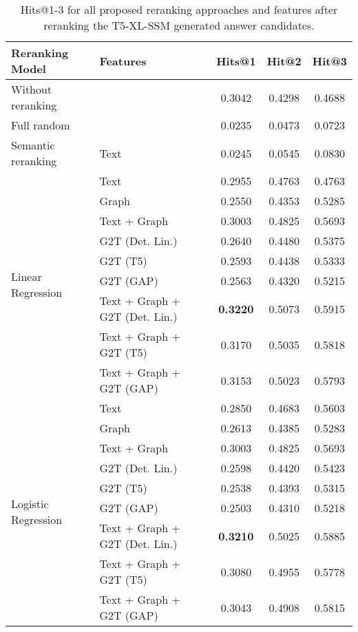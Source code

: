 \begin{table}[htbp]
    \caption{Hits@1-3 for all proposed reranking approaches and features after reranking the T5-XL-SSM generated answer candidates.}
    \label{tab:controllable_fusion:t5_xl_ssm_all_results1}
    \centering
    \begin{tabular}{l p{6cm} c c c}
        \toprule
        \textbf{Reranking Model} & \textbf{Features} & \textbf{Hits@1} & \textbf{Hit@2} & \textbf{Hit@3} \\
        \midrule
        Without reranking & & 0.3042 & 0.4298 & 0.4688 \\
        \cmidrule(lr){1-5}
        Full random & & 0.0235 & 0.0473 & 0.0723 \\
        \cmidrule(lr){1-5}
        Semantic reranking & Text & 0.0245 & 0.0545 & 0.0830 \\
        \cmidrule(lr){1-5}
        \multirow{9}{*}{Linear Regression} & Text & 0.2955 & 0.4763 & 0.4763 \\
        & Graph & 0.2550 & 0.4353 & 0.5285 \\
        & Text + Graph & 0.3003 & 0.4825 & 0.5693 \\
        & G2T (Det. Lin.) & 0.2640 & 0.4480 & 0.5375 \\
        & G2T (T5) & 0.2593 & 0.4438 & 0.5333 \\
        & G2T (GAP) & 0.2563 & 0.4320 & 0.5215 \\
        & Text + Graph + G2T (Det. Lin.) & \textbf{0.3220} & 0.5073 & 0.5915 \\
        & Text + Graph + G2T (T5) & 0.3170 & 0.5035 & 0.5818 \\
        & Text + Graph + G2T (GAP) & 0.3153 & 0.5023 & 0.5793 \\
        \midrule
        \multirow{12}{*}{Logistic Regression} & Text & 0.2850 & 0.4683 & 0.5603 \\
        & Graph & 0.2613 & 0.4385 & 0.5283 \\
        & Text + Graph & 0.3003 & 0.4825 & 0.5693 \\
        & G2T (Det. Lin.) & 0.2598 & 0.4420 & 0.5423 \\
        & G2T (T5) & 0.2538 & 0.4393 & 0.5315 \\
        & G2T (GAP) & 0.2503 & 0.4310 & 0.5218 \\
        & Text + Graph + G2T (Det. Lin.) & \textbf{0.3210} & 0.5025 & 0.5885 \\
        & Text + Graph + G2T (T5) & 0.3080 & 0.4955 & 0.5778 \\
        & Text + Graph + G2T (GAP) & 0.3043 & 0.4908 & 0.5815 \\
        \bottomrule
    \end{tabular}
\end{table}

